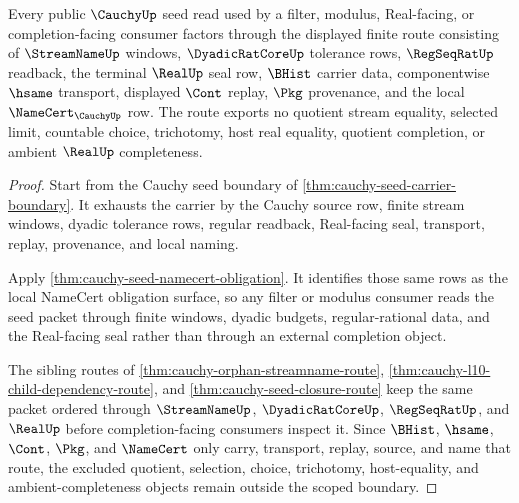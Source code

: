 \begin{theorem}
\label{thm:cauchy-filter-modulus-scoped-route}
Every public $\CauchyUp$ seed read used by a filter, modulus, Real-facing, or completion-facing consumer factors through the displayed finite route consisting of $\StreamNameUp$ windows, $\DyadicRatCoreUp$ tolerance rows, $\RegSeqRatUp$ readback, the terminal $\RealUp$ seal row, $\BHist$ carrier data, componentwise $\hsame$ transport, displayed $\Cont$ replay, $\Pkg$ provenance, and the local $\NameCert_{\CauchyUp}$ row. The route exports no quotient stream equality, selected limit, countable choice, trichotomy, host real equality, quotient completion, or ambient $\RealUp$ completeness.
\end{theorem}
\begin{proof}
Start from the Cauchy seed boundary of \autoref{thm:cauchy-seed-carrier-boundary}. It exhausts the carrier by the Cauchy source row, finite stream windows, dyadic tolerance rows, regular readback, Real-facing seal, transport, replay, provenance, and local naming.

Apply \autoref{thm:cauchy-seed-namecert-obligation}. It identifies those same rows as the local NameCert obligation surface, so any filter or modulus consumer reads the seed packet through finite windows, dyadic budgets, regular-rational data, and the Real-facing seal rather than through an external completion object.

The sibling routes of \autoref{thm:cauchy-orphan-streamname-route}, \autoref{thm:cauchy-l10-child-dependency-route}, and \autoref{thm:cauchy-seed-closure-route} keep the same packet ordered through $\StreamNameUp$, $\DyadicRatCoreUp$, $\RegSeqRatUp$, and $\RealUp$ before completion-facing consumers inspect it. Since $\BHist$, $\hsame$, $\Cont$, $\Pkg$, and $\NameCert$ only carry, transport, replay, source, and name that route, the excluded quotient, selection, choice, trichotomy, host-equality, and ambient-completeness objects remain outside the scoped boundary.
\end{proof}


